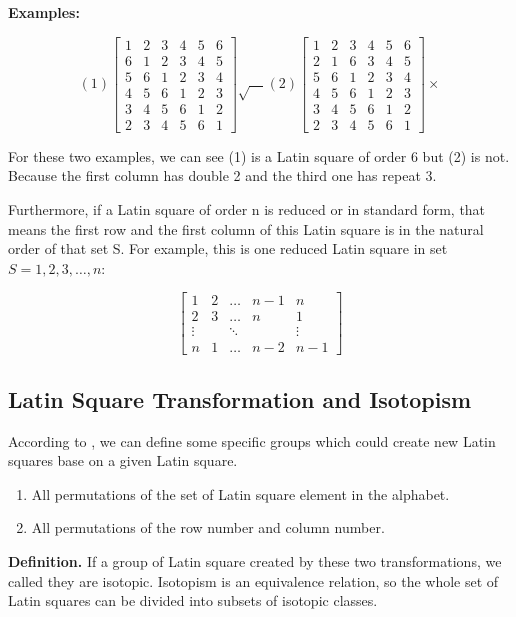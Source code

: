 \documentclass[12pt]{article}
\begin{document}
\textbf{Examples:}

\[ (1) \begin{bmatrix} 1 & 2 & 3 & 4 & 5 & 6\\6 & 1 & 2 & 3 & 4 & 5\\5 & 6 & 1 & 2 & 3 & 4\\
                   4 & 5 & 6 & 1 & 2 & 3\\3 & 4 & 5 & 6 & 1 & 2\\2 & 3 & 4 & 5 & 6 & 1\end{bmatrix}\surd \quad
   (2) \begin{bmatrix} 1 & 2 & 3 & 4 & 5 & 6\\2 & 1 & 6 & 3 & 4 & 5\\5 & 6 & 1 & 2 & 3 & 4\\
                   4 & 5 & 6 & 1 & 2 & 3\\3 & 4 & 5 & 6 & 1 & 2\\2 & 3 & 4 & 5 & 6 & 1\end{bmatrix}\times \]

For these two examples, we can see (1) is a Latin square of order 6 but (2) is not. Because the first column has double 2 and the third one has repeat 3.

Furthermore, if a Latin square of order n is reduced or in standard form, that means the first row and the first column of this Latin square is in the natural order of that set S. For example, this is one reduced Latin square in set $S = {1, 2, 3, …, n}$:


\[ \begin{bmatrix}
1 & 2 & \dots & n-1 & n \\
2 & 3 & \dots & n & 1 \\
\vdots &  & \ddots &  & \vdots \\
n & 1 & \dots & n-2 & n-1 \end{bmatrix} \]

\subsection{Latin Square Transformation and Isotopism}

According to \cite{ref1}, we can define some specific groups which could create new Latin squares base on a given Latin square.

\begin{enumerate}[1.]
\item All permutations of the set of Latin square element in the alphabet.
\item All permutations of the row number and column number.
\end{enumerate}
\textbf{Definition.} If a group of Latin square created by these two transformations, we called they are isotopic. Isotopism is an equivalence relation, so the whole set of Latin squares can be divided into subsets of isotopic classes.\\
\end{document}

